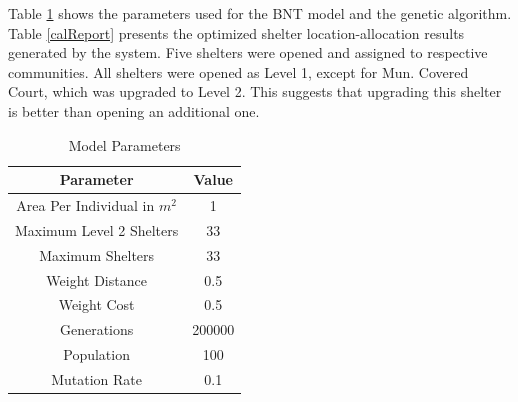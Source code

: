 \documentclass[12pt,a4paper,]{article}
\begin{document}
	Table \ref{modelParams} shows the parameters used for the BNT model and the genetic algorithm. Table \ref{calReport} presents the optimized shelter location-allocation results generated by the system. Five shelters were opened and assigned to respective communities. All shelters were opened as Level 1, except for Mun. Covered Court, which was upgraded to Level 2. This suggests that upgrading this shelter is better than opening an additional one.
	
	\begin{table}[h]
		\centering
		\caption{Model Parameters}
		\label{modelParams}
		\begin{tabular}{|c|c|}
			\hline
			\textbf{Parameter} & \textbf{Value} \\ \hline
			Area Per Individual in $m^2$ & 1 \\ 
			Maximum Level 2 Shelters  & 33 \\ 
			Maximum Shelters & 33 \\ 
			Weight Distance & 0.5 \\ 
			Weight Cost & 0.5 \\ 
			Generations & 200000 \\ 
			Population & 100 \\ 
			Mutation Rate & 0.1 \\ \hline
		\end{tabular}
	\end{table}
	
\end{document}
